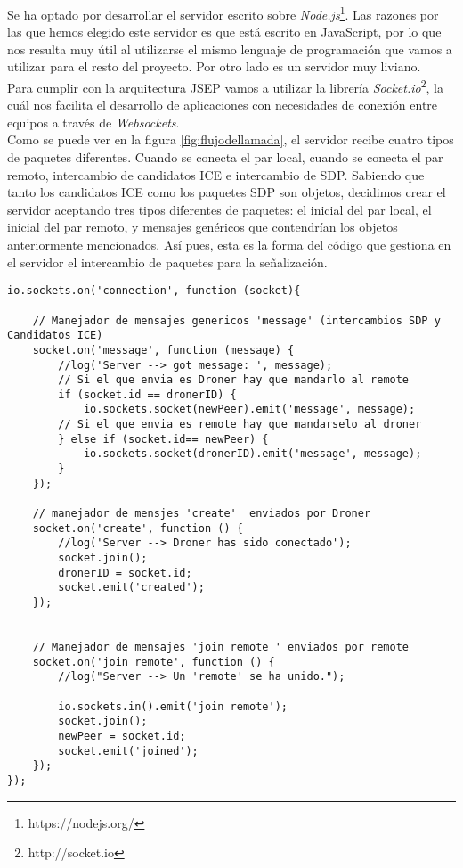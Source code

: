 Se ha optado por desarrollar el servidor escrito sobre \emph{Node.js}\footnote{https://nodejs.org/}. Las razones por las que hemos elegido este servidor es que está escrito en JavaScript, por lo que nos resulta muy útil al utilizarse el mismo lenguaje de programación que vamos a utilizar para el resto del proyecto. Por otro lado es un servidor muy liviano.\\

Para cumplir con la arquitectura JSEP vamos a utilizar la librería \emph{Socket.io}\footnote{http://socket.io}, la cuál nos facilita el desarrollo de aplicaciones con necesidades de conexión entre equipos a través de \emph{Websockets}.\\

Como se puede ver en la figura \ref{fig:flujodellamada}, el servidor recibe cuatro tipos de paquetes diferentes. Cuando se conecta el par local, cuando se conecta el par remoto, intercambio de candidatos ICE e intercambio de SDP. Sabiendo que tanto los candidatos ICE como los paquetes SDP son objetos, decidimos crear el servidor aceptando tres tipos diferentes de paquetes: el inicial del par local, el inicial del par remoto, y mensajes genéricos que contendrían los objetos anteriormente mencionados. Así pues, esta es la forma del código que gestiona en el servidor el intercambio de paquetes para la señalización.\\

\begin{lstlisting}[caption=Núcleo servidor de señalización]
io.sockets.on('connection', function (socket){

	// Manejador de mensajes genericos 'message' (intercambios SDP y Candidatos ICE)
	socket.on('message', function (message) {
		//log('Server --> got message: ', message);
		// Si el que envia es Droner hay que mandarlo al remote
		if (socket.id == dronerID) {
			io.sockets.socket(newPeer).emit('message', message);
		// Si el que envia es remote hay que mandarselo al droner
		} else if (socket.id== newPeer) {
			io.sockets.socket(dronerID).emit('message', message);
		} 
	});

	// manejador de mensjes 'create'  enviados por Droner
	socket.on('create', function () {
		//log('Server --> Droner has sido conectado');
		socket.join();
		dronerID = socket.id;
		socket.emit('created');
	});
	

	// Manejador de mensajes 'join remote ' enviados por remote
	socket.on('join remote', function () {
		//log("Server --> Un 'remote' se ha unido.");
		
		io.sockets.in().emit('join remote');
		socket.join();
		newPeer = socket.id;
		socket.emit('joined');
	});
});
\end{lstlisting}

